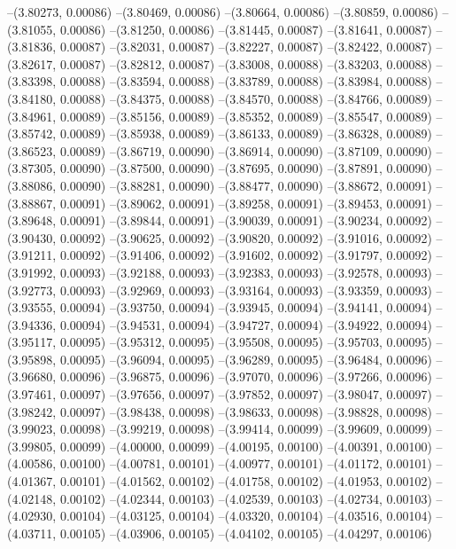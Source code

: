 --(3.80273, 0.00086)
--(3.80469, 0.00086)
--(3.80664, 0.00086)
--(3.80859, 0.00086)
--(3.81055, 0.00086)
--(3.81250, 0.00086)
--(3.81445, 0.00087)
--(3.81641, 0.00087)
--(3.81836, 0.00087)
--(3.82031, 0.00087)
--(3.82227, 0.00087)
--(3.82422, 0.00087)
--(3.82617, 0.00087)
--(3.82812, 0.00087)
--(3.83008, 0.00088)
--(3.83203, 0.00088)
--(3.83398, 0.00088)
--(3.83594, 0.00088)
--(3.83789, 0.00088)
--(3.83984, 0.00088)
--(3.84180, 0.00088)
--(3.84375, 0.00088)
--(3.84570, 0.00088)
--(3.84766, 0.00089)
--(3.84961, 0.00089)
--(3.85156, 0.00089)
--(3.85352, 0.00089)
--(3.85547, 0.00089)
--(3.85742, 0.00089)
--(3.85938, 0.00089)
--(3.86133, 0.00089)
--(3.86328, 0.00089)
--(3.86523, 0.00089)
--(3.86719, 0.00090)
--(3.86914, 0.00090)
--(3.87109, 0.00090)
--(3.87305, 0.00090)
--(3.87500, 0.00090)
--(3.87695, 0.00090)
--(3.87891, 0.00090)
--(3.88086, 0.00090)
--(3.88281, 0.00090)
--(3.88477, 0.00090)
--(3.88672, 0.00091)
--(3.88867, 0.00091)
--(3.89062, 0.00091)
--(3.89258, 0.00091)
--(3.89453, 0.00091)
--(3.89648, 0.00091)
--(3.89844, 0.00091)
--(3.90039, 0.00091)
--(3.90234, 0.00092)
--(3.90430, 0.00092)
--(3.90625, 0.00092)
--(3.90820, 0.00092)
--(3.91016, 0.00092)
--(3.91211, 0.00092)
--(3.91406, 0.00092)
--(3.91602, 0.00092)
--(3.91797, 0.00092)
--(3.91992, 0.00093)
--(3.92188, 0.00093)
--(3.92383, 0.00093)
--(3.92578, 0.00093)
--(3.92773, 0.00093)
--(3.92969, 0.00093)
--(3.93164, 0.00093)
--(3.93359, 0.00093)
--(3.93555, 0.00094)
--(3.93750, 0.00094)
--(3.93945, 0.00094)
--(3.94141, 0.00094)
--(3.94336, 0.00094)
--(3.94531, 0.00094)
--(3.94727, 0.00094)
--(3.94922, 0.00094)
--(3.95117, 0.00095)
--(3.95312, 0.00095)
--(3.95508, 0.00095)
--(3.95703, 0.00095)
--(3.95898, 0.00095)
--(3.96094, 0.00095)
--(3.96289, 0.00095)
--(3.96484, 0.00096)
--(3.96680, 0.00096)
--(3.96875, 0.00096)
--(3.97070, 0.00096)
--(3.97266, 0.00096)
--(3.97461, 0.00097)
--(3.97656, 0.00097)
--(3.97852, 0.00097)
--(3.98047, 0.00097)
--(3.98242, 0.00097)
--(3.98438, 0.00098)
--(3.98633, 0.00098)
--(3.98828, 0.00098)
--(3.99023, 0.00098)
--(3.99219, 0.00098)
--(3.99414, 0.00099)
--(3.99609, 0.00099)
--(3.99805, 0.00099)
--(4.00000, 0.00099)
--(4.00195, 0.00100)
--(4.00391, 0.00100)
--(4.00586, 0.00100)
--(4.00781, 0.00101)
--(4.00977, 0.00101)
--(4.01172, 0.00101)
--(4.01367, 0.00101)
--(4.01562, 0.00102)
--(4.01758, 0.00102)
--(4.01953, 0.00102)
--(4.02148, 0.00102)
--(4.02344, 0.00103)
--(4.02539, 0.00103)
--(4.02734, 0.00103)
--(4.02930, 0.00104)
--(4.03125, 0.00104)
--(4.03320, 0.00104)
--(4.03516, 0.00104)
--(4.03711, 0.00105)
--(4.03906, 0.00105)
--(4.04102, 0.00105)
--(4.04297, 0.00106)
